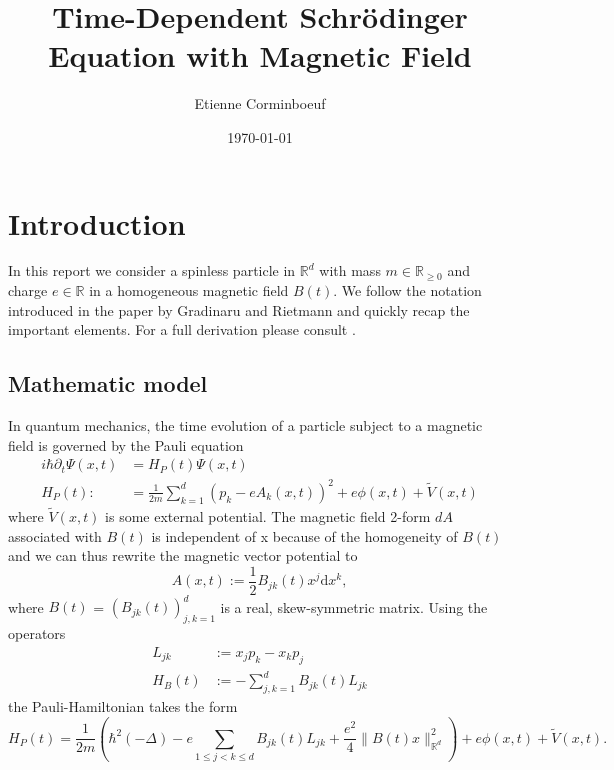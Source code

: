 \documentclass{article}
\title{Time-Dependent Schr{\"o}dinger Equation with Magnetic Field}
\author{Etienne Corminboeuf}
\date{\today}
\begin{document}
\maketitle

\tableofcontents

\section{Introduction}
In this report we consider a spinless particle in $\mathbb{R}^d$ with mass $m \in \mathbb{R}_{\geq 0}$ and charge $e\in \mathbb{R}$ in a homogeneous magnetic field $B(t)$. We follow the notation introduced in the paper by Gradinaru and Rietmann and quickly recap the important elements. For a full derivation please consult \cite{paper_orvg}.
\subsection{Mathematic model}

In quantum mechanics, the time evolution of a particle subject to a magnetic field is governed by the Pauli equation
\begin{align} \label{eq_pauli}
  i \hbar \partial_t \Psi(x,t) &= H_P(t)\Psi(x,t) \\
  H_P(t) :&= \frac{1}{2m} \sum_{k=1}^d (p_k - e A_k(x,t))^2 + e\phi(x,t) + \tilde{V}(x,t)
\end{align}
where $\tilde{V}(x,t)$ is some external potential.
The magnetic field 2-form $dA$ associated with $B(t)$ is independent of x because of the homogeneity of $B(t)$ and we can thus rewrite the magnetic vector potential to
\begin{equation}
  A(x,t) := \frac{1}{2}B_{jk}(t)x^j \textrm{d}x^k,
\end{equation}
where $B(t)$ = $(B_{jk}(t))_{j,k = 1}^d$ is a real, skew-symmetric matrix. Using the operators
\begin{align}
  L_{jk} & := x_j p_k - x_k p_j \\
  H_B(t) & := - \sum_{j,k = 1}^d B_{jk}(t) L_{jk}
\end{align}
the Pauli-Hamiltonian takes the form
\begin{equation}
  H_P(t) = \frac{1}{2 m} \left(\hbar^{2}(-\Delta)-e \sum_{1 \leqslant j<k \leqslant d} B_{j k}(t) L_{j k} +\frac{e^{2}}{4}\|B(t) x\|_{\mathbb{R}^{d}}^{2}  \right) + e \phi(x,t) + \tilde{V}(x,t).
\end{equation}
\end{document}
